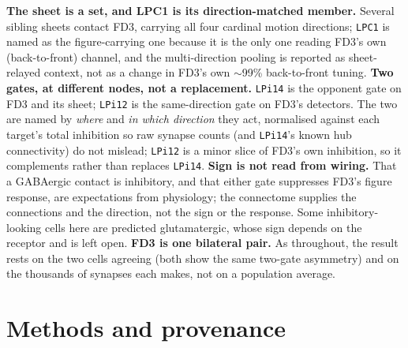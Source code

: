 \documentclass[11pt]{article}
\newcommand{\ttt}[1]{\texttt{#1}}
\begin{document}
\textbf{The sheet is a set, and LPC1 is its direction-matched member.} Several sibling sheets contact FD3, carrying all four cardinal motion directions; \ttt{LPC1} is named as the figure-carrying one because it is the only one reading FD3's own (back-to-front) channel, and the multi-direction pooling is reported as sheet-relayed context, not as a change in FD3's own $\sim$99\% back-to-front tuning. \textbf{Two gates, at different nodes, not a replacement.} \ttt{LPi14} is the opponent gate on FD3 and its sheet; \ttt{LPi12} is the same-direction gate on FD3's detectors. The two are named by \emph{where} and \emph{in which direction} they act, normalised against each target's total inhibition so raw synapse counts (and \ttt{LPi14}'s known hub connectivity) do not mislead; \ttt{LPi12} is a minor slice of FD3's own inhibition, so it complements rather than replaces \ttt{LPi14}. \textbf{Sign is not read from wiring.} That a GABAergic contact is inhibitory, and that either gate suppresses FD3's figure response, are expectations from physiology; the connectome supplies the connections and the direction, not the sign or the response. Some inhibitory-looking cells here are predicted glutamatergic, whose sign depends on the receptor and is left open. \textbf{FD3 is one bilateral pair.} As throughout, the result rests on the two cells agreeing (both show the same two-gate asymmetry) and on the thousands of synapses each makes, not on a population average.

\section{Methods and provenance}
\end{document}
